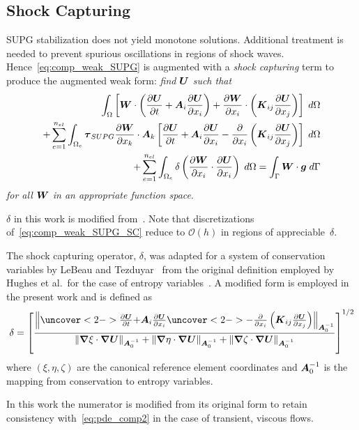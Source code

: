 \documentclass[compress,11pt]{beamer}
\begin{document}
\subsection{Shock Capturing}
\frame
{
  \small
  SUPG stabilization does not yield monotone solutions.  Additional treatment is needed to prevent spurious oscillations in regions of shock waves.  Hence~\eqref{eq:comp_weak_SUPG} is augmented with a \emph{shock capturing} term to produce the augmented weak form: \emph{find ${\boldsymbol{U}}$ such that}
  \begin{eqnarray}
  \label{eq:comp_weak_SUPG_SC}
  \int_\Omega  \left[ {\boldsymbol{W}}\cdot\left({\frac{\partial{{\boldsymbol{U}}}}{\partial{t}}} + {\boldsymbol{A}}_i {\frac{\partial{{\boldsymbol{U}}}}{\partial{x_i}}} \right) + {\frac{\partial{{\boldsymbol{W}}}}{\partial{x_i}}} \cdot \left( {\boldsymbol{K}}_{ij} {\frac{\partial{{\boldsymbol{U}}}}{\partial{x_j}}} \right) \right] \; d\Omega \nonumber \\
  + \sum_{e=1}^{n_{el}} \int_{\Omega_e} {\boldsymbol{\tau}}_{SUPG} {\frac{\partial{{\boldsymbol{W}}}}{\partial{x_k}}}\cdot{\boldsymbol{A}}_k
  \left[ {\frac{\partial{{\boldsymbol{U}}}}{\partial{t}}} + {\boldsymbol{A}}_i {\frac{\partial{{\boldsymbol{U}}}}{\partial{x_i}}} - {\frac{\partial{}}{\partial{x_i}}} \left( {\boldsymbol{K}}_{ij} {\frac{\partial{{\boldsymbol{U}}}}{\partial{x_j}}} \right) \right] \; d\Omega  \nonumber \\
  + \sum_{e=1}^{n_{el}} \int_{\Omega_e} \delta \left({\frac{\partial{{\boldsymbol{W}}}}{\partial{x_i}}}\cdot{\frac{\partial{{\boldsymbol{U}}}}{\partial{x_i}}}\right)\; d\Omega
   = \int_\Gamma {\boldsymbol{W}}\cdot{\boldsymbol{g}} \; d\Gamma
\end{eqnarray}
  \emph{for all ${\boldsymbol{W}}$ in an appropriate function space}.
  \vspace{.5em}
  
  $\delta$ in this work is modified from~\cite{gjlebeau_thesis,skaliabadi_dissertation}.  Note that discretizations of~\eqref{eq:comp_weak_SUPG_SC} reduce to $\mathcal{O}(h)$ in regions of appreciable~$\delta$.
  \normalsize  
}

\frame
{
  \small
  The shock capturing operator, $\delta$, was adapted for a system of conservation variables by LeBeau and Tezduyar~\cite{gjlebeau_thesis,skaliabadi_dissertation,aliabadi_tezduyar_IJNMF_1995} from the original definition employed by Hughes et al.\ for the case of entropy variables~\cite{hughes_shock_capturing,shakib_hughes_ns}.  A modified form is employed in the present work and is defined as
\begin{equation}
  \label{eq:shock_capturing_parameter}
  \delta = \left[\frac{\left\|\uncover<2->{\pdv{\bv{U}}{t} +} \bt{A}_i\pdv{\bv{U}}{x_i}
                       \uncover<2->{- \pdv{}{x_i} \left( \bt{K}_{ij} \pdv{\bv{U}}{x_j} \right)}\right\|_{\bt{A}_0^{-1}}}
                      {\|\grad{\xi}  \cdot\grad{\bv{U}}\|_{\bt{A}_0^{-1}} +
		       \|\grad{\eta} \cdot\grad{\bv{U}}\|_{\bt{A}_0^{-1}} +
		       \|\grad{\zeta}\cdot\grad{\bv{U}}\|_{\bt{A}_0^{-1}}}\right]^{1/2}
\end{equation}
where $\left(\xi,\eta,\zeta\right)$ are the canonical reference element coordinates and ${\boldsymbol{A}}_0^{-1}$ is the mapping from conservation to entropy variables.
\vspace{.5em}

    {
      In this work the numerator is modified from its original form to retain consistency with~\eqref{eq:pde_comp2} in the case of transient, viscous flows.
    }
}
\end{document}
